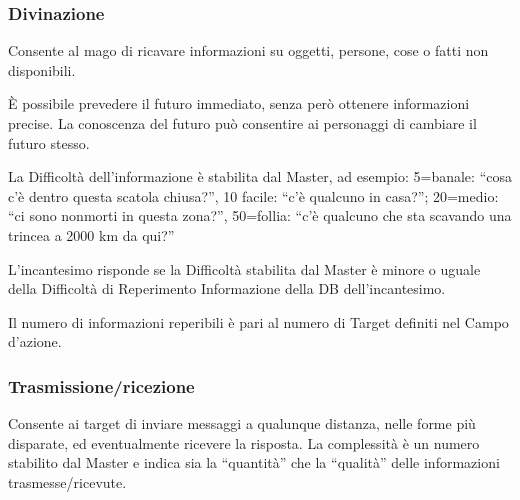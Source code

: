 \subsubsection{Divinazione} 

Consente al mago di ricavare informazioni su oggetti, persone, cose o
fatti non disponibili. 

\`E possibile prevedere il futuro immediato, senza per\`o ottenere
informazioni precise. La conoscenza del futuro pu\`o consentire ai
personaggi di cambiare il futuro stesso.

La Difficolt\`a dell'informazione \`e stabilita dal Master,
ad esempio: 5=banale: ``cosa c'\`e dentro questa scatola chiusa?'', 10
facile: ``c'\`e qualcuno in casa?''; 20=medio: ``ci sono non\-morti in
questa zona?'', 50=follia: ``c'\`e qualcuno che sta scavando una
trincea a 2000 km da qui?''

L'incantesimo risponde se la Difficolt\`a stabilita dal Master \`e
minore o uguale della Difficolt\`a di Reperimento Informazione della
DB dell'incantesimo.

Il numero di informazioni reperibili \`e pari al numero di Target
definiti nel Campo d'azione.




\subsubsection{Trasmissione/ricezione}
Consente ai target di inviare messaggi a qualunque distanza, nelle
forme pi\`u disparate, ed eventualmente ricevere la risposta. La
complessit\`a \`e un numero stabilito dal Master e indica sia la
``quantit\`a'' che la ``qualit\`a'' delle informazioni
trasmesse/ricevute.




